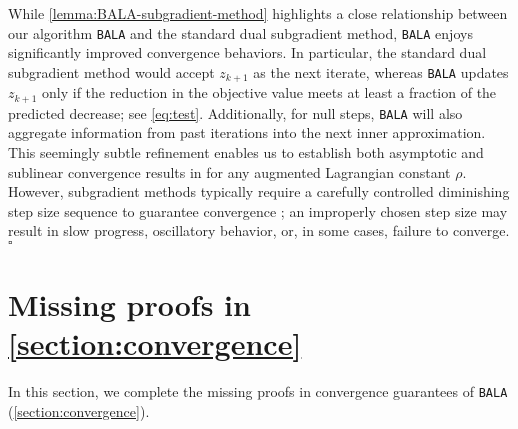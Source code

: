 \documentclass[11pt]{article}
\newcommand{\alg}{\texttt{BALA}}%
\begin{document}
\begin{remark} While \cref{lemma:BALA-subgradient-method} highlights a close relationship between our algorithm \alg{} and the standard dual subgradient method, \alg{} enjoys significantly improved convergence behaviors.  In particular, the standard dual subgradient method would accept $z_{k+1}$ as the next iterate, whereas \alg{} updates $z_{k+1}$ only if the reduction in the objective value meets at least a fraction of the predicted decrease; see \cref{eq:test}. Additionally, for null steps, \alg{} will also 
aggregate information from past iterations into the next inner approximation. This seemingly subtle refinement enables us to establish both asymptotic and sublinear convergence results in   for any augmented Lagrangian constant $\rho$. However, subgradient methods typically require a carefully controlled diminishing step size sequence to guarantee convergence \cite[Theorem 7.4.]{ruszczynski2011nonlinear}; an improperly chosen step size may result in slow progress, oscillatory behavior, or, in some cases, failure to converge.  \hfill $\square$
\end{remark}




\section{Missing proofs in \cref{section:convergence}}
\label{apx:section:missing-proof}
In this section, we complete the missing proofs in convergence guarantees of \alg{} (\cref{section:convergence}).
\end{document}

